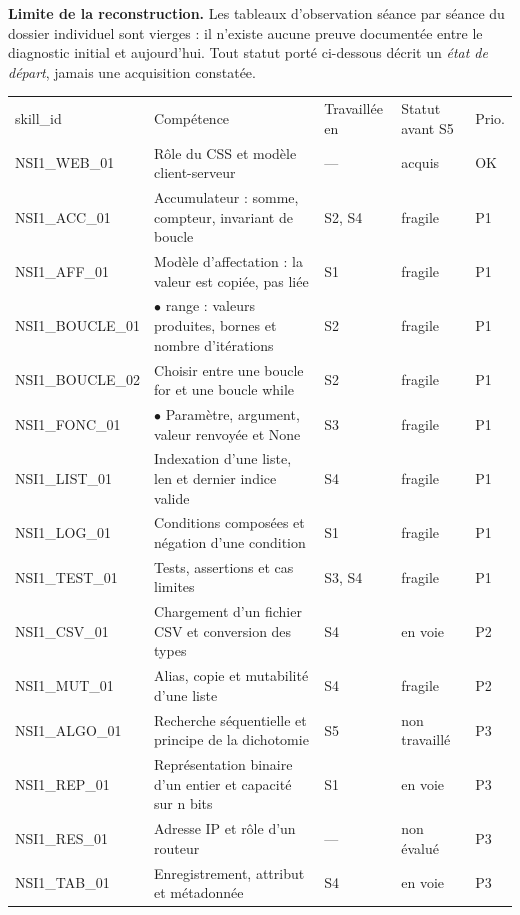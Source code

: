 \documentclass[10pt,a4paper]{article}
\begin{document}
\begin{warningbox}\textbf{Limite de la reconstruction.} Les tableaux d'observation séance par séance du dossier individuel sont vierges : il n'existe aucune preuve documentée entre le diagnostic initial et aujourd'hui. Tout statut porté ci-dessous décrit un \emph{état de départ}, jamais une acquisition constatée.\end{warningbox}
\newpage{}
\par\noindent\begin{tabularx}{\linewidth}{>{\ttfamily\scriptsize}p{27mm} X >{\scriptsize}p{16mm} >{\scriptsize}p{20mm} >{\scriptsize\centering\arraybackslash}p{9mm}}
\rowcolor{Navy}\color{white}\scriptsize skill\_id & \color{white}Compétence & \color{white}Travaillée en & \color{white}Statut avant S5 & \color{white}Prio. \\
NSI1\_WEB\_01 & Rôle du CSS et modèle client-serveur & --- & acquis & OK \\
NSI1\_ACC\_01 & Accumulateur : somme, compteur, invariant de boucle & S2, S4 & fragile & P1 \\
NSI1\_AFF\_01 & Modèle d'affectation : la valeur est copiée, pas liée & S1 & fragile & P1 \\
NSI1\_BOUCLE\_01 & $\bullet$ range : valeurs produites, bornes et nombre d'itérations & S2 & fragile & P1 \\
NSI1\_BOUCLE\_02 & Choisir entre une boucle for et une boucle while & S2 & fragile & P1 \\
NSI1\_FONC\_01 & $\bullet$ Paramètre, argument, valeur renvoyée et None & S3 & fragile & P1 \\
NSI1\_LIST\_01 & Indexation d'une liste, len et dernier indice valide & S4 & fragile & P1 \\
NSI1\_LOG\_01 & Conditions composées et négation d'une condition & S1 & fragile & P1 \\
NSI1\_TEST\_01 & Tests, assertions et cas limites & S3, S4 & fragile & P1 \\
NSI1\_CSV\_01 & Chargement d'un fichier CSV et conversion des types & S4 & en voie & P2 \\
NSI1\_MUT\_01 & Alias, copie et mutabilité d'une liste & S4 & fragile & P2 \\
NSI1\_ALGO\_01 & Recherche séquentielle et principe de la dichotomie & S5 & non travaillé & P3 \\
NSI1\_REP\_01 & Représentation binaire d'un entier et capacité sur n bits & S1 & en voie & P3 \\
NSI1\_RES\_01 & Adresse IP et rôle d'un routeur & --- & non évalué & P3 \\
NSI1\_TAB\_01 & Enregistrement, attribut et métadonnée & S4 & en voie & P3 \\
\end{tabularx}
\end{document}
